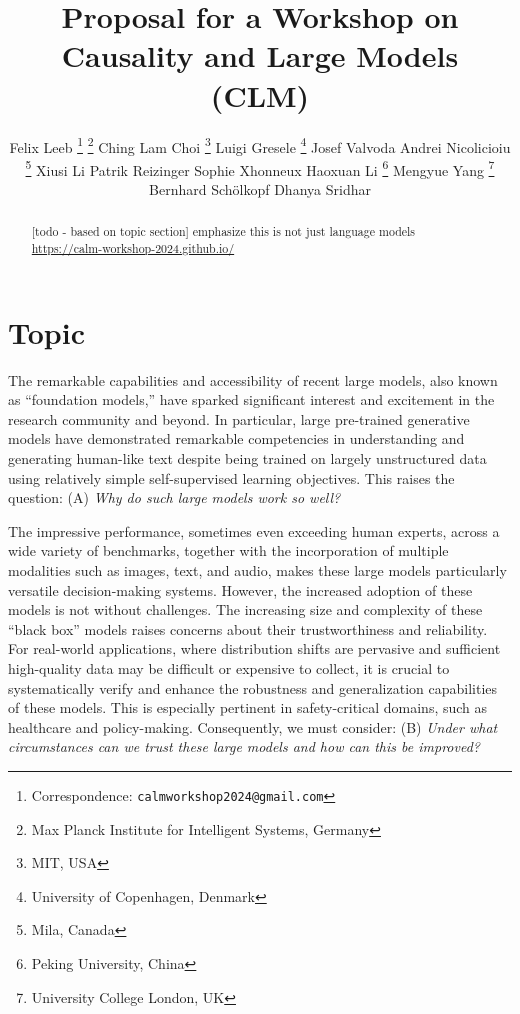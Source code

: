 \documentclass{article}
\title{Proposal for a Workshop on \\
Causality and Large Models (C\emoji{heart}LM)}
\author{%
    Felix Leeb \thanks{Correspondence: \texttt{calmworkshop2024@gmail.com}} 
    \thanks{Max Planck Institute for Intelligent Systems, Germany}
    \And
    Ching Lam Choi \footnotemark[1] \thanks{MIT, USA}
    \And
    Luigi Gresele \thanks{University of Copenhagen, Denmark}
    \And
    Josef Valvoda \footnotemark[4]
    \And
    Andrei Nicolicioiu \thanks{Mila, Canada}
    \And
    Xiusi Li \footnotemark[5]
    \And
    Patrik Reizinger \footnotemark[2]
    \And
    Sophie Xhonneux \footnotemark[5]
    \And
    Haoxuan Li \thanks{Peking University, China}
    \And
    Mengyue Yang \thanks{University College London, UK}
    \And
    Bernhard Schölkopf \footnotemark[2]
    \And
    Dhanya Sridhar \footnotemark[5]
}
\newcommand{\todo}[1]{\textcolor{red}{~TODO: #1}}
\begin{document}
\maketitle


\begin{abstract}
[todo - based on topic section] emphasize this is not just language models
\url{https://calm-workshop-2024.github.io/}
\end{abstract}



\section{Topic}

The remarkable capabilities and accessibility of recent large models, also known as ``foundation models,'' have sparked significant interest and excitement in the research community and beyond. In particular, large pre-trained generative models have demonstrated remarkable competencies in understanding and generating human-like text despite being trained on largely unstructured data using relatively simple self-supervised learning objectives. This raises the question: (A) \textit{Why do such large models work so well?} %

The impressive performance, sometimes even exceeding human experts, across a wide variety of benchmarks, together with the incorporation of multiple modalities such as images, text, and audio, makes these large models particularly versatile decision-making systems.
However, the increased adoption of these models is not without challenges. The increasing size and complexity of these ``black box'' models raises concerns about their trustworthiness and reliability.
For real-world applications, where distribution shifts are pervasive and sufficient high-quality data may be difficult or expensive to collect, it is crucial to systematically verify and enhance the robustness and generalization capabilities of these models.   
This is especially pertinent in safety-critical domains, such as healthcare and policy-making. %
Consequently, we must consider: (B) \textit{Under what circumstances can we trust these large models and how can this be improved?} %
\end{document}
